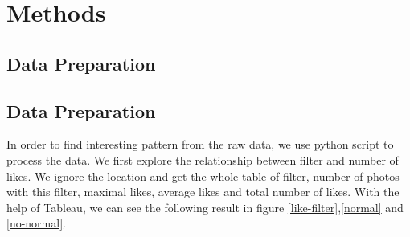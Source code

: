 \documentclass[conference]{acmsiggraph}
\begin{document}
\section{Methods}

\subsection{Data Preparation}
\subsection{Data Preparation}

In order to find interesting pattern from the raw data, we use python script to process the data. We first explore the relationship between filter and number of likes. We ignore the location and get the whole table of filter, number of photos with this filter, maximal likes, average likes and total number of likes.  With the help of Tableau, we can see the following result in figure \ref{like-filter},\ref{normal} and \ref{no-normal}.
\end{document}
